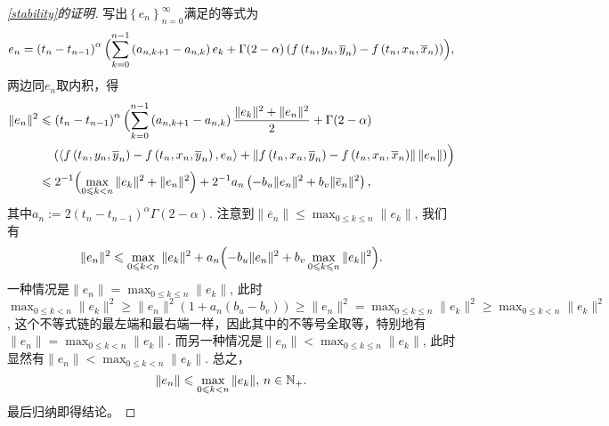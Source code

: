 \begin{proof}[\cref{stability}的证明]
    写出$\left\{e_n\right\}_{n=0}^\infty$满足的等式为
    \begin{equation*}
        e_n=\left(t_n-t_{n-1}\right)^\alpha\Bigl(\sum_{k=0}^{n-1}\left(a_{n,k+1}-a_{n,k}\right)e_k+\Gamma(2-\alpha)\left(f\left(t_n,y_n,\overline y_n\right)-f\left(t_n,x_n,\overline x_n\right)\right)\Bigr),
    \end{equation*}
    两边同$e_n$取内积，得
    \begin{align*}
        \|e_n\|^2&\leqslant\left(t_n-t_{n-1}\right)^\alpha\Bigl(\sum_{k=0}^{n-1}\left(a_{n,k+1}-a_{n,k}\right)\frac{\|e_k\|^2+\|e_n\|^2}{2}+\Gamma(2-\alpha)
        \\& \relphantom{=}\left(\left<f\left(t_n,y_n,\overline y_n\right)-f\left(t_n,x_n,\overline y_n\right),e_n\right>+\left\|f\left(t_n,x_n,\overline y_n\right)-f\left(t_n,x_n,\overline x_n\right)\right\|\left\|e_n\right\|\right)\Bigr)
        \\&\leqslant 2^{-1}\Bigl(\max_{0\leqslant k<n} \|e_k\|^2 + \|e_n\|^2\Bigr)
        +2^{-1}a_n\left(-b_u \|e_n\|^2+b_v \|\overline e_n\|^2\right),
    \end{align*}
    其中$a_n:=2\left(t_n-t_{n-1}\right)^\alpha\Gamma(2-\alpha)$. 注意到$\|\overline e_n\|\leqslant \max_{0\leqslant k\leqslant n} \|e_k\|$, 我们有
    \begin{equation*}
        \|e_n\|^2\leqslant \max_{0\leqslant k<n} \|e_k\|^2+a_n\Bigl(-b_u \|e_n\|^2+b_v \max_{0\leqslant k\leqslant n} \|e_k\|^2\Bigr).
    \end{equation*}
    一种情况是$\|e_n\|=\max_{0\leqslant k\leqslant n} \|e_k\|$, 此时$\max_{0\leqslant k<n} \|e_k\|^2 \geqslant \|e_n\|^2 (1+ a_n(b_u-b_v))\geqslant \|e_n\|^2=\max_{0\leqslant k\leqslant n} \|e_k\|^2\geqslant \max_{0\leqslant k<n} \|e_k\|^2$, 这个不等式链的最左端和最右端一样，因此其中的不等号全取等，特别地有$\|e_n\|=\max_{0\leqslant k<n} \|e_k\|$. 而另一种情况是$\|e_n\|<\max_{0\leqslant k\leqslant n} \|e_k\|$, 此时显然有$\|e_n\|<\max_{0\leqslant k< n} \|e_k\|$. 总之，
    \begin{equation*}
        \|e_n\|\leqslant\max_{0\leqslant k< n} \|e_k\|,\,n\in\mathbb{N_+}.
    \end{equation*}
    最后归纳即得结论。
\end{proof}